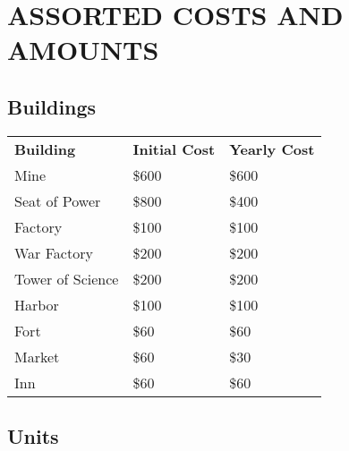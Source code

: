 
\chapter{\textsf{ASSORTED COSTS AND AMOUNTS}}


\section{\textsf{Buildings}}

\begin{tabular}{|p{1.3in} p{1.3in} p{1.3in}|}
    \hline
    \textbf{Building} & \textbf{Initial Cost} & \textbf{Yearly Cost} \\ 
    \rowcolor{gray}Mine & \$600 & \$600 \\ 
    Seat of Power & \$800 & \$400 \\ 
    \rowcolor{gray}Factory    & \$100 & \$100 \\ 
    War Factory    & \$200 & \$200 \\ 
    \rowcolor{gray}Tower of Science & \$200 & \$200 \\ 
    Harbor & \$100 &\$100 \\ 
    \rowcolor{gray}Fort & \$60 & \$60 \\ 
    Market & \$60 & \$30 \\ 
    \rowcolor{gray}Inn    & \$60 & \$60 \\ 
    \hline
\end{tabular}    

\clearpage

\section{\textsf{Units}}

